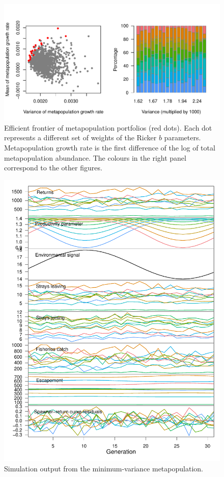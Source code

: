 \documentclass[12pt]{article}
\begin{document}
\begin{figure}[htbp]
\centering
\includegraphics{figure/eff-frontier-eg.pdf}
\caption{Efficient frontier of metapopulation portfolios (red dots).
Each dot represents a different set of weights of the Ricker $b$
parameters. Metapopulation growth rate is the first difference of the
log of total metapopulation abundance. The colours in the right panel
correspond to the other figures.}
\end{figure}

\begin{figure}[htbp]
\centering
\includegraphics{figure/plot-eff-ports.pdf}
\caption{Simulation output from the minimum-variance metapopulation.}
\end{figure}
\end{document}
